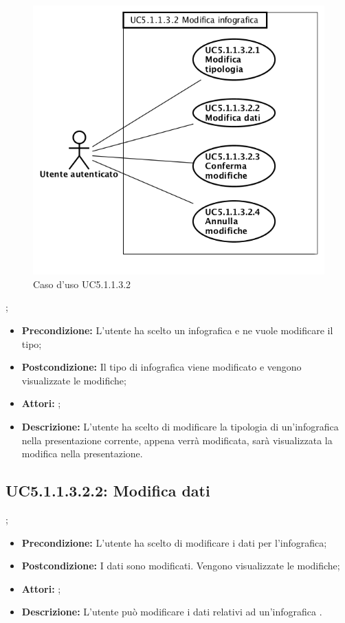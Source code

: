 \begin{figure}[h]
	\begin{center}
	\includegraphics[scale=0.4]{diagram/UC5-1-1-3-2.png}
	\caption{Caso d'uso UC5.1.1.3.2}
	\end{center}
\end{figure};
\begin{itemize}
	\item \textbf{Precondizione:} L'utente ha scelto un infografica e ne vuole modificare il tipo;
	\item \textbf{Postcondizione:} Il tipo di infografica viene modificato e vengono visualizzate le modifiche;
	\item \textbf{Attori:} ;
	\item \textbf{Descrizione:} L'utente ha scelto di modificare la tipologia di un'infografica nella presentazione corrente, appena verrà modificata, sarà visualizzata la modifica nella presentazione.
\end{itemize}
\subsection{ UC5.1.1.3.2.2: Modifica dati}
;
\begin{itemize}
	\item \textbf{Precondizione:} L'utente ha scelto di modificare i dati per l'infografica;
	\item \textbf{Postcondizione:} I dati sono modificati. Vengono visualizzate le modifiche;
	\item \textbf{Attori:} ;
	\item \textbf{Descrizione:} L'utente può modificare i dati relativi ad un'infografica .
\end{itemize}
